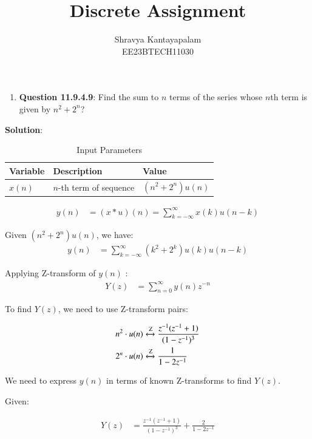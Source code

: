 \documentclass[journal,12pt,onecolumn]{IEEEtran}
\theoremstyle{remark}
\begin{document}
\title{Discrete Assignment}
\author{Shravya Kantayapalam\\ EE23BTECH11030}
\maketitle

\begin{enumerate}
    \item \textbf{Question 11.9.4.9}:
    Find the sum to $n$ terms of the series whose $n$th term is given by $n^2 + 2^n$?
 \end{enumerate}  
    \textbf{Solution}:
   

\begin{table}[htbp]
    \centering
    \caption{Input Parameters}
    \begin{tabular}{|l|l|l|}
    \hline
    \textbf{Variable} & \textbf{Description} & \textbf{Value} \\
    \hline
    \( x(n) \) & \( n \)-th term of sequence & \( (n^2 + 2^n)u(n) \) \\
    \hline
    \end{tabular}
\end{table}


\begin{align}
y(n) &= (x * u)(n) = \sum_{k=-\infty}^{\infty} x(k) u(n - k)
\end{align}

Given \( (n^2 + 2^n)u(n) \), we have:
\begin{align}
y(n) &= \sum_{k=-\infty}^{\infty} (k^2 + 2^k)u(k)u(n-k)
\end{align}

Applying Z-transform of \( y(n) \) :
\begin{align}
Y(z) &= \sum_{n=0}^{\infty} y(n)z^{-n}
\end{align}

To find \( Y(z) \), we need to use Z-transform pairs:

\begin{align}
n^2 \cdot u(n) &\xleftrightarrow{\text{Z}} \frac{z^{-1}(z^{-1} + 1)}{(1 - z^{-1})^3} \\
2^n \cdot u(n) &\xleftrightarrow{\text{Z}} \frac{1}{1 - 2z^{-1}}
\end{align}

We need to express \( y(n) \) in terms of known Z-transforms to find \( Y(z) \).

Given:

\begin{align}
Y(z) &= \frac{z^{-1}(z^{-1} + 1)}{(1 - z^{-1})^3}  + \frac{2}{1 - 2z^{-1}}
\end{align}
\end{document}
